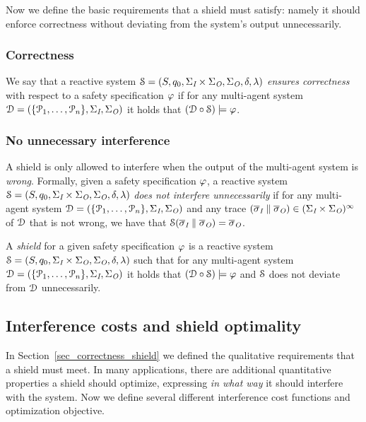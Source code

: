 Now we define the basic  requirements that a shield must satisfy: namely it should enforce correctness without deviating from the system's output unnecessarily.

\subsubsection{Correctness} We say that a reactive system $\mathcal{S} = (S,q_{0},\Sigma_{\textit{I}}\times\Sigma_{\textit{O}},\Sigma_{\textit{O}},\delta,\lambda)$   \emph{ensures correctness}  with respect to a safety specification $\varphi$ if for any multi-agent system
$\mathcal{D}=( \{\mathcal{P}_1,\ldots,\mathcal{P}_n\},\Sigma_{\textit{I}},  \Sigma_{\textit{O}})$ it holds that $(\mathcal{D} \circ  \mathcal{S}) \models \varphi$.

\subsubsection{No unnecessary interference}
A shield is only allowed to interfere when the output of the multi-agent system  is \emph{wrong}.
%
Formally, given a safety specification $\varphi$, a reactive system $\mathcal{S} = (S,q_{0},\Sigma_{\textit{I}}\times\Sigma_{\textit{O}},\Sigma_{\textit{O}},\delta,\lambda)$ \emph{does not interfere unnecessarily} if for any multi-agent system $\mathcal{D}=( \{\mathcal{P}_1,\ldots,\mathcal{P}_n\},\Sigma_{\textit{I}},  \Sigma_{\textit{O}})$ and any trace
$(\overline\sigma_{\textit{I}}\parallel\overline\sigma_{\textit{O}})\in (\Sigma_{\textit{I}} \times \Sigma_{\textit{O}})^\infty$
of $\mathcal{D}$ that is not wrong, we have that $\mathcal{S}(\overline\sigma_{\textit{I}} \parallel  \overline\sigma_{\textit{O}}) = \overline\sigma_{\textit{O}}$.

\begin{defn}
A \emph{shield} for a given safety specification $\varphi$ is a reactive system $\mathcal{S} = (S,q_{0},\Sigma_{\textit{I}}\times\Sigma_{\textit{O}},\Sigma_{\textit{O}},\delta,\lambda)$
such that  for any multi-agent system $\mathcal{D}=( \{\mathcal{P}_1,\ldots,\mathcal{P}_n\},\Sigma_{\textit{I}},  \Sigma_{\textit{O}})$ it holds that $(\mathcal{D} \circ \mathcal{S}) \models \varphi$ and $\mathcal{S}$  does not deviate from $\mathcal{D}$ unnecessarily.
\end{defn}

\subsection{Interference costs and shield optimality}
\label{sec_interf}

In Section~\ref{sec_correctness_shield} we defined the qualitative requirements that a shield must meet. In many applications, there are additional quantitative properties a shield should optimize, expressing \emph{in what way} it should interfere with the system.
Now  we define several different interference cost functions and  optimization objective.

